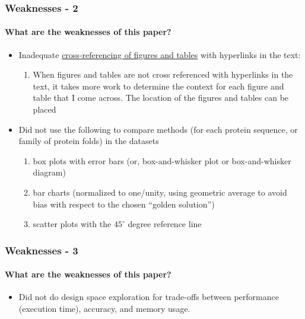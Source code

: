 \documentclass[xcolor={usenames,dvipsnames},hyperref={hyperindex,bookmarks}]{beamer}
\begin{document}
\frame
{
	\frametitle{Weaknesses - 2}
	\framesubtitle{What are the weaknesses of this paper?}

	\begin{itemize}
	\item Inadequate \href{https://blog.apastyle.org/apastyle/tables-and-figures/}{cross-referencing of figures and tables} with hyperlinks in the text: 
		\begin{enumerate} 
		\item When figures and tables are not cross referenced with hyperlinks in the text, it takes more work to determine the context for each figure and table that I come across. The location of the figures and tables can be placed
		\end{enumerate}
	\item Did not use the following to compare methods (for each protein sequence, or family of protein folds) in the datasets
		\begin{enumerate} 
		\item box plots with error bars (or, box-and-whisker plot or box-and-whisker diagram)
		\item bar charts (normalized to one/unity, using geometric average to avoid bias with respect to the chosen ``golden solution'')
		\item scatter plots with the $45^{\circ}$ degree reference line
		\end{enumerate}
	\end{itemize}
}




\frame
{
	\frametitle{Weaknesses - 3}
	\framesubtitle{What are the weaknesses of this paper?}

	\begin{itemize}
	\item Did not do design space exploration for trade-offs between performance (execution time), accuracy, and memory usage.
	\end{itemize}
}
\end{document}

